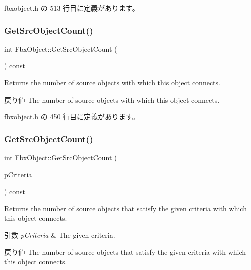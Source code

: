  fbxobject.\+h の 513 行目に定義があります。

\mbox{\label{class_fbx_object_a5fce56e85d5e0568243a5df99dabb42f}} 
\subsubsection{\texorpdfstring{Get\+Src\+Object\+Count()}{GetSrcObjectCount()}\hspace{0.1cm}{\footnotesize\ttfamily [1/4]}}
{\footnotesize\ttfamily int Fbx\+Object\+::\+Get\+Src\+Object\+Count (\begin{DoxyParamCaption}{ }\end{DoxyParamCaption}) const\hspace{0.3cm}{\ttfamily [inline]}}

Returns the number of source objects with which this object connects. \begin{DoxyReturn}{戻り値}
The number of source objects with which this object connects. 
\end{DoxyReturn}


 fbxobject.\+h の 450 行目に定義があります。

\mbox{\label{class_fbx_object_aa1fe90887d90288ee0c06121ec79c0a8}} 
\subsubsection{\texorpdfstring{Get\+Src\+Object\+Count()}{GetSrcObjectCount()}\hspace{0.1cm}{\footnotesize\ttfamily [2/4]}}
{\footnotesize\ttfamily int Fbx\+Object\+::\+Get\+Src\+Object\+Count (\begin{DoxyParamCaption}\item[{const \hyperlink{class_fbx_criteria}{Fbx\+Criteria} \&}]{p\+Criteria }\end{DoxyParamCaption}) const\hspace{0.3cm}{\ttfamily [inline]}}

Returns the number of source objects that satisfy the given criteria with which this object connects. 
\begin{DoxyParams}{引数}
{\em p\+Criteria} & The given criteria. \\
\hline
\end{DoxyParams}
\begin{DoxyReturn}{戻り値}
The number of source objects that satisfy the given criteria with which this object connects. 
\end{DoxyReturn}


